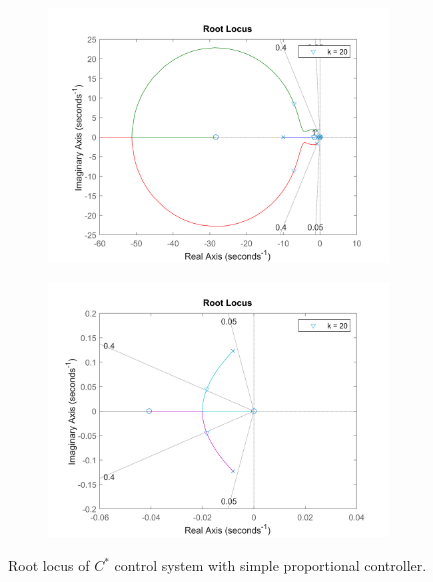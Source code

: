 \documentclass{article}
\begin{document}
\begin{figure}[H]
    \centering
    \begin{subfigure}{0.45\textwidth}
        \centering
        \includegraphics[width=0.99\textwidth]{figures/cstar_base_rlocus.png}
    \end{subfigure}
    \begin{subfigure}{0.45\textwidth}
        \centering
        \includegraphics[width=0.99\textwidth]{figures/cstar_base_rlocus_zoomed.png}
    \end{subfigure}
    \caption{Root locus of $C^*$ control system with simple proportional controller.}
    \label{fig:cstar_base_rlocus}
\end{figure}
\end{document}
